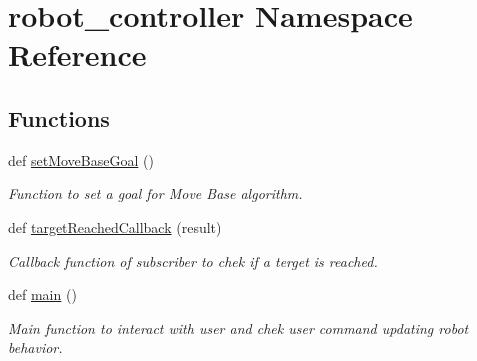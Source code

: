 \hypertarget{namespacerobot__controller}{}\section{robot\+\_\+controller Namespace Reference}
\label{namespacerobot__controller}
\subsection*{Functions}
\begin{DoxyCompactItemize}
\item 
def \hyperlink{namespacerobot__controller_aa66c35aafe94622df0790c654690167f}{set\+Move\+Base\+Goal} ()
\begin{DoxyCompactList}\small\item\em Function to set a goal for Move Base algorithm. \end{DoxyCompactList}\item 
def \hyperlink{namespacerobot__controller_a999934045deb6f2f2ec8229d2a79ac27}{target\+Reached\+Callback} (result)
\begin{DoxyCompactList}\small\item\em Callback function of subscriber to chek if a terget is reached. \end{DoxyCompactList}\item 
def \hyperlink{namespacerobot__controller_accbf10a6a15201c2588764d5481947e7}{main} ()
\begin{DoxyCompactList}\small\item\em Main function to interact with user and chek user command updating robot behavior. \end{DoxyCompactList}\end{DoxyCompactItemize}
